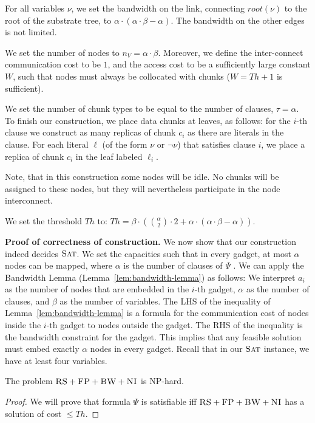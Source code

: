\documentclass[conference,10pt]{IEEEtran}
\newcommand{\maciek}[1]{\textcolor{brown}{maciek: #1}}
\newcommand{\variab}{\nu}
\newcommand{\clauses}{\alpha}
\newcommand{\variables}{\beta}
\newcommand{\achunk}{\ensuremath{c}}
\newcommand{\CC}{\textsc{NI}}
\newcommand{\FP}{\textsc{FP}}
\newcommand{\RS}{\textsc{RS}}
\newcommand{\BW}{\textsc{BW}}
\newcommand{\Vms}{\ensuremath{n_V}}
\newcommand{\SAT}{\textsc{Sat}}
\newcommand{\Formula}{\ensuremath{\Psi}}
\newcommand{\Thr}{\ensuremath{Th}}
\begin{document}
\begin{appendix}
For all variables $\nu$, we set the bandwidth
on the link, connecting $root(\nu)$ to the root of
the substrate tree, to $\clauses\cdot(\clauses\cdot\variables-\clauses)$. The bandwidth on the other
edges is not limited.


We set the number of nodes to $\Vms = \clauses \cdot \variables$.
Moreover, we define the inter-connect communication cost to be $1$,
and the access cost to be a sufficiently large constant $W$,
such that nodes must always be collocated with chunks ($W = \Thr + 1$ is
sufficient).


We set the number of chunk types to be equal to the number of clauses, $\tau =
\clauses$. To finish our construction, we place data chunks at
leaves, as follows: for the $i$-th clause we
construct as many replicas of chunk $\achunk_i$ as there are literals in the
clause. For each literal $\ell$ (of the form $\variab$ or $\neg \variab$) that satisfies clause $i$,
 we place
a replica of chunk $\achunk_i$ in the leaf labeled $\ell_i$.

Note, that in this construction some nodes will be idle. No chunks will be 
assigned to these nodes, but they will nevertheless participate in the node 
interconnect.

We set the threshold $\Thr$ to:
$ \Thr = \variables \cdot ({\clauses  \choose 2} \cdot 2 +
\clauses \cdot (\clauses
\cdot \variables - \clauses))$.

\textbf{Proof of correctness of construction.}
We now show that our construction indeed
decides $\SAT$. We set the capacities such that in every gadget,
at most $\clauses$ nodes can be mapped, where $\clauses$
is the number of clauses of $\Formula$
.
We can apply the Bandwidth Lemma (Lemma~\ref{lem:bandwidth-lemma}) as follows:
We interpret $a_i$ as the
number of nodes that are embedded in the $i$-th gadget, $\clauses$
as the number
of clauses, and $\variables$ as the number of variables.
The LHS of the inequality of Lemma~\ref{lem:bandwidth-lemma}
is a formula for the communication cost of nodes inside the $i$-th
gadget to nodes outside the gadget. The RHS of the inequality is the
bandwidth constraint for the gadget. This implies that
any feasible solution must embed exactly $\clauses$ nodes in every gadget.
Recall that in our $\SAT$ instance, we have at least four variables.

\begin{theorem}
The problem $\RS+\FP+\BW+\CC$ is NP-hard.
\label{theorem:3sat}
\end{theorem}
\begin{proof}
We will prove that formula $\Formula$ is satisfiable iff $\RS+\FP+\BW+\CC$ has
a solution of cost $\leq \Thr$.


\end{proof}
\end{appendix}
\end{document}
